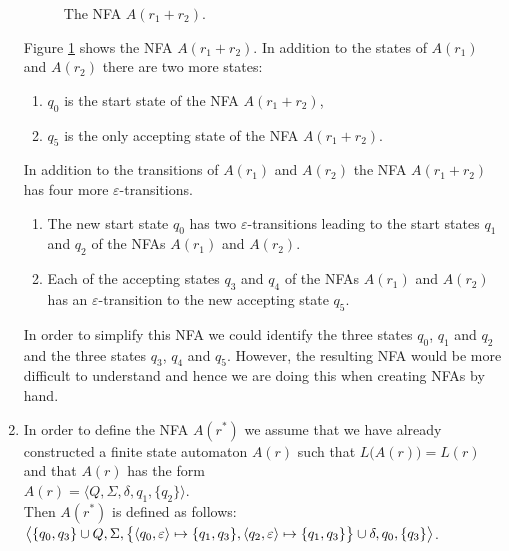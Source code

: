 \begin{enumerate}
      \begin{figure}[!ht]
        \centering
      \caption{The \textsc{NFA} $A(r_1 + r_2)$.}
      \label{fig:aPlus.eps}
      \end{figure}
      Figure \ref{fig:aPlus.eps} shows the \textsc{NFA} $A(r_1 + r_2)$.
      In addition to the states of $A(r_1)$ and $A(r_2)$ there are two more states:
      \begin{enumerate}
      \item $q_0$ is the start state of the \textsc{NFA} $A(r_1 + r_2)$,
      \item $q_5$ is the only accepting state of the \textsc{NFA} $A(r_1 + r_2)$.
      \end{enumerate}
      In addition to the transitions of $A(r_1)$ and $A(r_2)$ the \textsc{NFA} $A(r_1+r_2)$
      has four more $\varepsilon$-transitions.
      \begin{enumerate}
      \item The new start state $q_0$ has two
            $\varepsilon$-transitions leading to the start states $q_1$ and $q_2$ of the \textsc{NFA}s
            $A(r_1)$ and $A(r_2)$.
      \item Each of the accepting states $q_3$ and $q_4$ of the \textsc{NFA}s
             $A(r_1)$ and $A(r_2)$ has an $\varepsilon$-transition to the new accepting state $q_5$.
      \end{enumerate}
      In order to simplify this \textsc{NFA} we could identify the three states
      $q_0$, $q_1$ and $q_2$ and the three states $q_3$, $q_4$ and $q_5$.  However, the resulting \textsc{NFA}
      would be more difficult to understand and hence we are \underline{} doing this when creating 
      \textsc{NFA}s by hand.
\item In order to define the \textsc{NFA} $A(r^*)$ we assume that we have already constructed a finite
      state automaton $A(r)$ such that $L\bigl(A(r)\bigr) = L(r)$ and that $A(r)$ has the form
      \\[0.2cm]
      \hspace*{1.3cm}
      $A(r) = \bigl\langle Q, \Sigma, \delta, q_1, \{ q_2 \} \bigr\rangle$.
      \\[0.2cm]
      Then  $A(r^*)$ is defined as follows:
      \\[0.2cm]
      \hspace*{0.8cm}
       $\bigl\langle \{ q_0, q_3 \} \cup Q, \Sigma, 
                \bigl\{ \pair(q_0,\varepsilon) \mapsto \{q_1, q_3\}, \pair(q_2,\varepsilon) \mapsto \{q_1, q_3\} \bigr\} 
                \cup \delta, q_0, \{ q_3 \} \bigr\rangle$.
      \\[0.2cm]



\end{enumerate}
